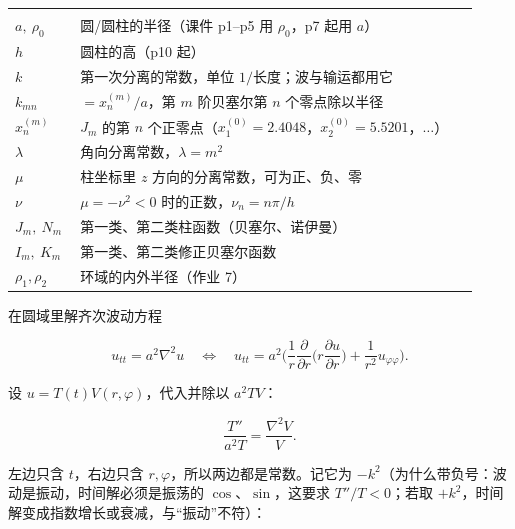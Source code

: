 \begin{center}
\tabtop
\begin{tabular}{@{}L{0.12\linewidth}L{0.80\linewidth}@{}}
 &  \\
\tabmidrule
$a,\ \rho_0$ & 圆/圆柱的半径（课件 p1--p5 用 $\rho_0$，p7 起用 $a$） \\
$h$ & 圆柱的高（p10 起） \\
$k$ & 第一次分离的常数，单位 $1/$长度；波与输运都用它 \\
$k_{mn}$ & $=x_n^{(m)}/a$，第 $m$ 阶贝塞尔第 $n$ 个零点除以半径 \\
$x_n^{(m)}$ & $J_m$ 的第 $n$ 个正零点（$x_1^{(0)}=2.4048$，$x_2^{(0)}=5.5201$，$\dots$） \\
$\lambda$ & 角向分离常数，$\lambda=m^2$ \\
$\mu$ & 柱坐标里 $z$ 方向的分离常数，可为正、负、零 \\
$\nu$ & $\mu=-\nu^2<0$ 时的正数，$\nu_n=n\pi/h$ \\
$J_m,\ N_m$ & 第一类、第二类柱函数（贝塞尔、诺伊曼） \\
$I_m,\ K_m$ & 第一类、第二类修正贝塞尔函数 \\
$\rho_1,\rho_2$ & 环域的内外半径（作业 7） \\
\end{tabular}
\tabbot
\end{center}


\label{sec:831}



在圆域里解齐次波动方程

\begin{equation}
u_{tt}=a^2\nabla^2u\quad\Longleftrightarrow\quad u_{tt}=a^2\Big(\frac1r\frac{\partial}{\partial r}\Big(r\frac{\partial u}{\partial r}\Big)+\frac1{r^2}u_{\varphi\varphi}\Big).
\label{eq:wave}
\end{equation}

设 $u=T(t)V(r,\varphi)$，代入并除以 $a^2TV$：

\[
\frac{T''}{a^2T}=\frac{\nabla^2V}{V}.
\]

左边只含 $t$，右边只含 $r,\varphi$，所以两边都是常数。记它为 $-k^2$（为什么带负号：波动是振动，时间解必须是振荡的 $\cos$、$\sin$，这要求 $T''/T<0$；若取 $+k^2$，时间解变成指数增长或衰减，与“振动”不符）：

